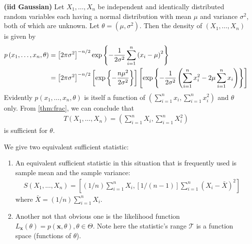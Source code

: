\documentclass{article}
\newcommand{\bfs}[1]{\textbf{({#1}) }}
\begin{document}
\begin{exma}\bfs{\gls{iid} Gaussian}\label{ex:iid_gaussian_0}
 Let $X_{1}, \ldots, X_{n}$ be independent and identically distributed random variables each having a normal distribution with mean $\mu$ and variance $\sigma^{2}$, both of which are
unknown. Let $\theta=\left(\mu, \sigma^{2}\right)$. Then the density of $\left(X_{1}, \ldots, X_{n}\right)$ is given by
\begin{align}
p\left(x_{1}, \ldots, x_{n}, \theta\right) &=\left[2 \pi \sigma^{2}\right]^{-n / 2} \exp \left\{-\frac{1}{2 \sigma^{2}} \sum_{i=1}^{n}\left(x_{i}-\mu\right)^{2}\right\} \nonumber\\ 
&=\left[2 \pi \sigma^{2}\right]^{-n / 2}\left[\exp \left\{-\frac{n \mu^{2}}{2 \sigma^{2}}\right\}\right]\left[\exp \left\{-\frac{1}{2 \sigma^{2}}\left(\sum_{i=1}^{n} x_{i}^{2}-2 \mu \sum_{i=1}^{n} x_{i}\right)\right\}\right]\label{eq:iid_gaussian}
\end{align}
Evidently $p\left(x_{1}, \ldots, x_{n}, \theta\right)$ is itself a function of $\left(\sum_{i=1}^{n} x_{i}, \sum_{i=1}^{n} x_{i}^{2}\right)$ and $\theta$ only.  From \cref{thm:frac},  we can conclude that
\begin{align*}
T\left(X_{1}, \ldots, X_{n}\right)=\left(\sum_{i=1}^{n} X_{i}, \sum_{i=1}^{n} X_{i}^{2}\right)
\end{align*}
is sufficient for $\theta$. 
\end{exma}
\begin{rema} We give two equivalent sufficient statistic:
\begin{enumerate}
    \item An  equivalent sufficient statistic in this situation that is frequently used is sample mean and the sample variance:
\begin{align*}
S\left(X_{1}, \ldots, X_{n}\right)=\left[(1 / n) \sum_{i=1}^{n} X_{i},[1 /(n-1)] \sum_{i=1}^{n}\left(X_{i}-\bar{X}\right)^{2}\right]
\end{align*}
where $\bar{X}=(1 / n) \sum_{i=1}^{n} X_{i}$.
\item Another not that obvious one is the likelihood function $L_{\mathbf{x}}(\theta)=p(\mathbf{x}, \theta), \theta \in \Theta .$ Note here the statistic's range $\mathcal{T}$ is a function space (functions of $\theta$).
\end{enumerate}

\end{rema}
\end{document}
